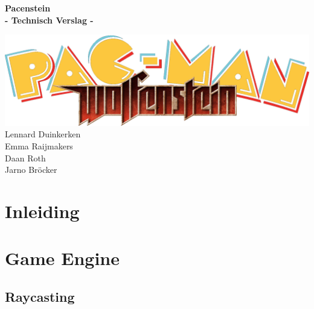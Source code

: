 \documentclass{report}
\begin{document}
\begin{titlepage}
\centering
\vfill
\bfseries\Huge{Pacenstein\\\large{- Technisch Verslag -}}\\
\normalfont\normalsize{}
\vfill

\includegraphics[width=\textwidth]{../res/pacenstein.png}
\vfill
\large{
  Lennard Duinkerken\\
  Emma Raijmakers\\
  Daan Roth\\
  Jarno Bröcker
}
\vfill
\end{titlepage}

\tableofcontents

\chapter{Inleiding} %
\label{cha:inleiding}


\chapter{Game Engine} %
\label{cha:game_engine}

  \section{Raycasting} %
  \label{sec:raycasting}
\end{document}
